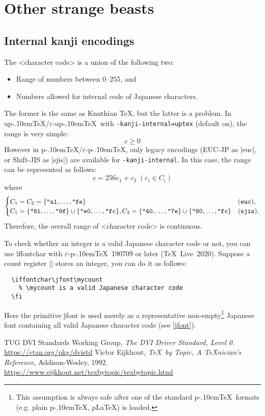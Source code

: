 \documentclass[a4paper,11pt]{article}
\let\emph=\origemph
\def\code#1{\texttt{#1}}
\def\epTeX{$\varepsilon$-\pTeX}\def\eTeX{$\varepsilon$-\TeX}
\def\eupTeX{$\varepsilon$-\upTeX}\def\upTeX{u\pTeX}
\def\pTeX{p\kern-.10em\TeX}
\def\pLaTeX{p\LaTeX}\def\upLaTeX{u\pLaTeX}
\def\TL{\TeX\ Live\ }
\begin{document}
\section{Other strange beasts}


\subsection{Internal kanji encodings}\label{kanji-internal}

The <character code> is a union of the following two:
\begin{itemize}
 \item Range of numbers between 0--255, and
 \item Numbers allowed for internal code of Japanese characters.
\end{itemize}
The former is the same as Knuthian \TeX, but the latter is a problem.
In \upTeX/\eupTeX\ with \code{-kanji-internal=uptex} (default on),
the range is very simple:
\[ c \ge 0 \]
However in \pTeX/\epTeX, only legacy encodings (EUC-JP as |euc|,
or Shift-JIS as |sjis|) are available for \code{-kanji-internal}.
In this case, the range can be represented as follows:
\[
  c = 256c_1+c_2 \; (c_i\in C_i)
\]
where
\[
  \begin{cases}
    C_1=C_2=\{\hex{a1},\dots,\hex{fe}\} & (\mathtt{euc}), \\
    C_1=\{\hex{81},\dots,\hex{9f}\}\cup\{\hex{e0},\dots,\hex{fc}\},
    C_2=\{\hex{40},\dots,\hex{7e}\}\cup\{\hex{80},\dots,\hex{fc}\} & (\mathtt{sjis}).
  \end{cases}
\]
Therefore, the overall range of <character code> is \emph{not} continuous.

To check whether an integer is a valid Japanese character code or not,
you can use \.{iffontchar} with \epTeX~190709 or later (\TL2020).
Suppose a count register |\mycount| stores an integer, you can do it as follows:
\begin{verbatim}
  \iffontchar\jfont\mycount
    % \mycount is a valid Japanese character code
  \fi
\end{verbatim}
Here the primitive \.{jfont} is used merely as
a representative non-empty\footnote{This assumption is always safe after
one of the standard \pTeX\ formats (e.g. plain \pTeX, \pLaTeX) is loaded.}
Japanese font containing all valid Japanese character code (see \ref{jfont}).


\newpage

\begin{thebibliography}{99}
  TUG DVI Standards Working Group,
  \textit{The DVI Driver Standard, Level 0}.\\
  \url{https://ctan.org/pkg/dvistd}
  Victor Eijkhout, \textit{\TeX\ by Topic, A \TeX nician's Reference},
  Addison-Wesley, 1992.\\
  \url{https://www.eijkhout.net/texbytopic/texbytopic.html}
\end{thebibliography}

\newpage
\printindex
\end{document}
